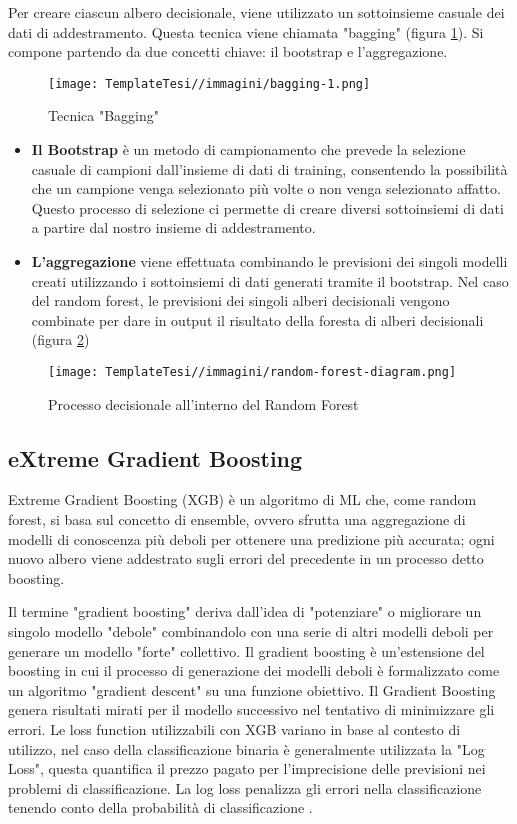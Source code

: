 \begin{flushleft}
Per creare ciascun albero decisionale, viene utilizzato un sottoinsieme casuale dei dati di addestramento. Questa tecnica viene chiamata "bagging" (figura \ref{fig:bagging}).
Si compone partendo da due concetti chiave: il bootstrap e l'aggregazione.
\begin{figure}[H]
    \centering
    \texttt{[image: TemplateTesi//immagini/bagging-1.png]}
    \caption{Tecnica "Bagging" \cite{immbagging}}
    \label{fig:bagging}
\end{figure}

\begin{itemize}
    \item \textbf{Il Bootstrap} è un metodo di campionamento che prevede la selezione casuale di campioni dall'insieme di dati di training, consentendo la possibilità che un campione venga selezionato più volte o non venga selezionato affatto. Questo processo di selezione ci permette di creare diversi sottoinsiemi di dati a partire dal nostro insieme di addestramento.

    \item \textbf{L'aggregazione} viene effettuata combinando le previsioni dei singoli modelli creati utilizzando i sottoinsiemi di dati generati tramite il bootstrap. Nel caso del random forest, le previsioni dei singoli alberi decisionali vengono combinate per dare in output il risultato della foresta di alberi decisionali (figura \ref{fig:randomforest})
\end{itemize}
\begin{figure}[H]
    \centering
    \texttt{[image: TemplateTesi//immagini/random-forest-diagram.png]}
    \caption{Processo decisionale all'interno del Random Forest \cite{immrf}}
    \label{fig:randomforest}
\end{figure}
\subsection{eXtreme Gradient Boosting}
Extreme Gradient Boosting (XGB)\cite{XGB} è un algoritmo di ML che, come random forest, si basa sul concetto di ensemble, ovvero sfrutta una aggregazione di modelli di conoscenza più deboli per ottenere una predizione più accurata; ogni nuovo albero viene addestrato sugli errori del precedente in un processo detto boosting.

Il termine "gradient boosting" deriva dall'idea di "potenziare" o migliorare un singolo modello "debole" combinandolo con una serie di altri modelli deboli per generare un modello "forte" collettivo. Il gradient boosting è un'estensione del boosting in cui il processo di generazione dei modelli deboli è formalizzato come un algoritmo "gradient descent" su una funzione obiettivo.
Il Gradient Boosting genera risultati mirati per il modello successivo nel tentativo di minimizzare gli errori.
Le loss function utilizzabili con XGB variano in base al contesto di utilizzo, nel caso della classificazione binaria è generalmente utilizzata la "Log Loss", questa quantifica il prezzo pagato per l'imprecisione delle previsioni nei problemi di classificazione. La log loss penalizza gli errori nella classificazione tenendo conto della probabilità di classificazione \cite{xgbloss1,xgbloss2,XGBNvidia}. 


\end{flushleft}
